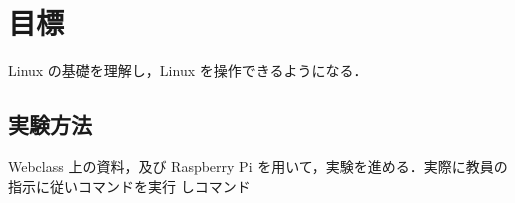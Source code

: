 \documentclass{myreport}  %
\begin{document}
\section{目標}

Linux の基礎を理解し，Linux を操作できるようになる．

\subsection{実験方法}
Webclass 上の資料，及び Raspberry Pi を用いて，実験を進める．実際に教員の指示に従いコマンドを実行
しコマンド
\end{document}
